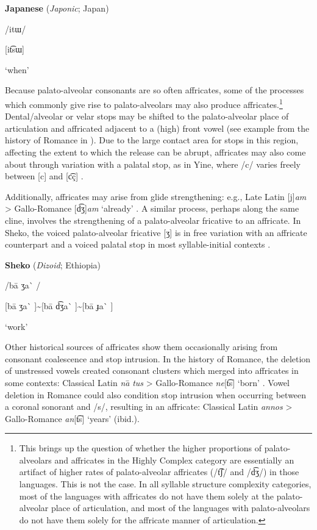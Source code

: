 \ea\label{ex:(4.45)}
  \textbf{Japanese} (\textit{Japonic}; Japan)

/itɯ/

[it͡sɯ]

\glt ‘when’

\citep[22]{Tsujimura2013}

\z

  Because palato-alveolar consonants are so often affricates, some of the processes which commonly give rise to palato-alveolars may also produce affricates.\footnote{ \textrm{This brings up the question of whether the higher proportions of palato-alveolars and affricates in the Highly Complex category are essentially an artifact of higher rates of palato-alveolar affricates (/t͡ʃ/ and /d͡ʒ/) in those languages. This is not the case. In all syllable structure complexity categories, most of the languages with affricates do not have them solely at the palato-alveolar place of articulation, and most of the languages with palato-alveolars do not have them solely for the affricate manner of articulation.}} Dental/alveolar or velar stops may be shifted to the palato-alveolar place of articulation and affricated adjacent to a (high) front vowel (see example from the history of Romance in ). Due to the large contact area for stops in this region, affecting the extent to which the release can be abrupt, affricates may also come about through variation with a palatal stop, as in Yine, where /c/ varies freely between [c] and [c͡ç] \citep[17-18]{Hanson2010}.

  Additionally, affricates may arise from glide strengthening: e.g., Late Latin [j]\textit{am} > Gallo-Romance [d͡ʒ]\textit{am} ‘already’ \citep[132]{Berns2013}. A similar process, perhaps along the same cline, involves the strengthening of a palato-alveolar fricative to an affricate. In Sheko, the voiced palato-alveolar fricative [ʒ] is in free variation with an affricate counterpart and a voiced palatal stop in most syllable-initial contexts .

\ea\label{ex:(4.46)}
  \textbf{Sheko} (\textit{Dizoid}; Ethiopia)

/ba\={} ʒa\`{} /

[ba\={} ʒa\`{} ]{\textasciitilde}[ba\={} d͡ʒa\`{} ]{\textasciitilde}[ba\={} ɟa\`{} ]

\glt ‘work’

\citep[86]{Hellenthal2010}

\z

  Other historical sources of affricates show them occasionally arising from consonant coalescence and stop intrusion. In the history of Romance, the deletion of unstressed vowels created consonant clusters which merged into affricates in some contexts: Classical Latin \textit{na}\textsf{\={} }\textit{tus} > Gallo-Romance \textit{ne}[t͡s] ‘born’ \citep[128]{Berns2013}. Vowel deletion in Romance could also condition stop intrusion when occurring between a coronal sonorant and /s/, resulting in an affricate: Classical Latin \textit{annos} > Gallo-Romance \textit{an}[t͡s] ‘years’ (ibid.).


